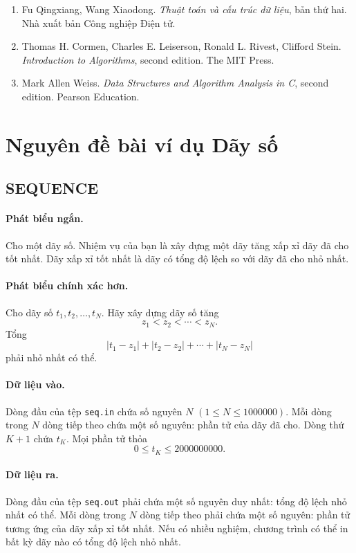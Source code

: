 \documentclass[11pt]{article}
\begin{document}
\begin{enumerate}
  \item Fu Qingxiang, Wang Xiaodong. \emph{Thuật toán và cấu trúc dữ liệu}, bản
  thứ hai. Nhà xuất bản Công nghiệp Điện tử.
  \item Thomas H. Cormen, Charles E. Leiserson, Ronald L. Rivest, Clifford Stein.
  \emph{Introduction to Algorithms}, second edition. The MIT Press.
  \item Mark Allen Weiss. \emph{Data Structures and Algorithm Analysis in C},
  second edition. Pearson Education.
\end{enumerate}

\appendix
\section{Nguyên đề bài ví dụ Dãy số}

\subsection*{SEQUENCE}

\paragraph{Phát biểu ngắn.}
Cho một dãy số. Nhiệm vụ của bạn là xây dựng một dãy tăng xấp xỉ dãy đã cho tốt
nhất. Dãy xấp xỉ tốt nhất là dãy có tổng độ lệch so với dãy đã cho nhỏ nhất.

\paragraph{Phát biểu chính xác hơn.}
Cho dãy số \(t_1,t_2,\ldots,t_N\). Hãy xây dựng dãy số tăng
\[
  z_1<z_2<\cdots<z_N.
\]
Tổng
\[
  |t_1-z_1|+|t_2-z_2|+\cdots+|t_N-z_N|
\]
phải nhỏ nhất có thể.

\paragraph{Dữ liệu vào.}
Dòng đầu của tệp \texttt{seq.in} chứa số nguyên \(N\)
\((1\le N\le 1000000)\). Mỗi dòng trong \(N\) dòng tiếp theo chứa một số nguyên:
phần tử của dãy đã cho. Dòng thứ \(K+1\) chứa \(t_K\). Mọi phần tử thỏa
\[
  0\le t_K\le 2000000000.
\]

\paragraph{Dữ liệu ra.}
Dòng đầu của tệp \texttt{seq.out} phải chứa một số nguyên duy nhất: tổng độ lệch
nhỏ nhất có thể. Mỗi dòng trong \(N\) dòng tiếp theo phải chứa một số nguyên:
phần tử tương ứng của dãy xấp xỉ tốt nhất. Nếu có nhiều nghiệm, chương trình có
thể in bất kỳ dãy nào có tổng độ lệch nhỏ nhất.
\end{document}
